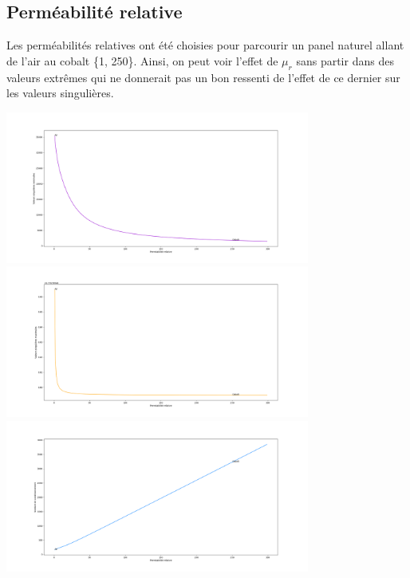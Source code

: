 \documentclass{article}[11pt]
\begin{document}
\subsection{Perméabilité relative}
Les perméabilités relatives ont été choisies pour parcourir un panel naturel allant de l'air au cobalt \{1, 250\}. Ainsi, on peut voir l'effet de $\mu_r$ sans partir dans des valeurs extrêmes qui ne donnerait pas un bon ressenti de l'effet de ce dernier sur les valeurs singulières.
\begin{center}
    \includegraphics[width = 10cm]{influences/plots/perm_min.png}
    \includegraphics[width = 10cm]{influences/plots/perm_max.png}
    \includegraphics[width = 10cm]{influences/plots/perm_k.png}
\end{center}
\end{document}
